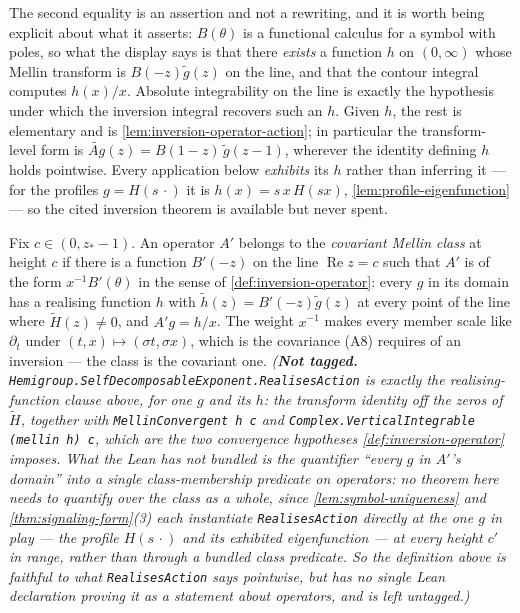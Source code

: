 The second equality is an assertion and not a rewriting, and it is worth being explicit about
what it asserts: $B(\theta)$ is a functional calculus for a symbol with poles, so what the
display says is that there \emph{exists} a function $h$ on $(0,\infty)$ whose Mellin transform is
$B(-z)\tilde g(z)$ on the line, and that the contour integral computes $h(x)/x$. Absolute
integrability on the line is exactly the hypothesis under which the inversion integral recovers
such an $h$. Given $h$, the rest is elementary and is \ref{lem:inversion-operator-action}; in
particular the transform-level form is $\widetilde{A g}(z) = B(1 - z)\,\tilde g(z - 1)$, wherever
the identity defining $h$ holds pointwise. Every application below \emph{exhibits} its $h$ rather
than inferring it --- for the profiles $g = H(s\,\cdot)$ it is $h(x) = s\,x\,H(sx)$,
\ref{lem:profile-eigenfunction} --- so the cited inversion theorem is available but never spent.

\begin{definition}\label{def:covariant-mellin-class}
Fix $c \in (0, z_* - 1)$. An operator $A'$ belongs to the \emph{covariant Mellin class} at height
$c$ if there is a function $B'(-z)$ on the line $\operatorname{Re} z = c$ such that $A'$ is of the
form $x^{-1}B'(\theta)$ in the sense of \ref{def:inversion-operator}: every $g$ in its domain has
a realising function $h$ with $\tilde h(z) = B'(-z)\tilde g(z)$ at every point of the line where
$\tilde H(z) \ne 0$, and $A'g = h/x$. The weight $x^{-1}$ makes every member scale like
$\partial_t$ under $(t,x) \mapsto (\sigma t, \sigma x)$, which is the covariance (A8) requires of
an inversion --- the class is the covariant one.
\statusT\quad\emph{(\textbf{Not tagged.}
\texttt{Hemigroup.SelfDecomposableExponent.RealisesAction} is exactly the realising-function
clause above, for one $g$ and its $h$: the transform identity off the zeros of $\tilde H$,
together with \texttt{MellinConvergent h c} and \texttt{Complex.VerticalIntegrable (mellin h) c},
which are the two convergence hypotheses \ref{def:inversion-operator} imposes. What the Lean has
\emph{not} bundled is the quantifier ``every $g$ in $A'$'s domain'' into a single class-membership
predicate on operators: no theorem here needs to quantify over the class as a whole, since
\ref{lem:symbol-uniqueness} and \ref{thm:signaling-form}(3) each instantiate
\texttt{RealisesAction} directly at the one $g$ in play --- the profile $H(s\,\cdot)$ and its
exhibited eigenfunction --- at every height $c'$ in range, rather than through a bundled class
predicate. So the definition above is faithful to what \texttt{RealisesAction} says pointwise, but
has no single Lean declaration proving it as a statement about operators, and is left untagged.)}
\end{definition}

